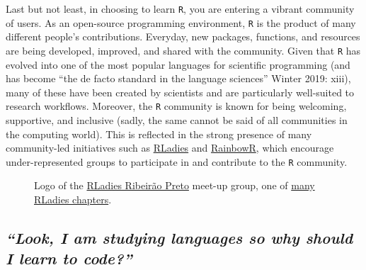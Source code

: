 \documentclass[
  letterpaper,
  DIV=11,
  numbers=noendperiod,
  oneside]{scrreprt}
\begin{document}
Last but not least, in choosing to learn \texttt{R}, you are entering a
vibrant community of users. As an open-source programming environment,
\texttt{R} is the product of many different people's contributions.
Everyday, new packages, functions, and resources are being developed,
improved, and shared with the community. Given that \texttt{R} has
evolved into one of the most popular languages for scientific
programming (and has become ``the de facto standard in the language
sciences'' Winter 2019: xiii), many of these have been created by
scientists and are particularly well-suited to research workflows.
Moreover, the \texttt{R} community is known for being welcoming,
supportive, and inclusive (sadly, the same cannot be said of all
communities in the computing world). This is reflected in the strong
presence of many community-led initiatives such as
\href{https://rladies.org/}{RLadies} and
\href{https://rainbowr.netlify.app/}{RainbowR}, which encourage
under-represented groups to participate in and contribute to the
\texttt{R} community. 🤗

\begin{figure}


\caption{\label{fig-RLadies}Logo of the
\href{https://rladiesrp.github.io/}{RLadies Ribeirão Preto} meet-up
group, one of
\href{https://benubah.github.io/r-community-explorer/rladies.html}{many
RLadies chapters}.}

\end{figure}%

\subsection*{\texorpdfstring{\emph{``Look, I am studying languages so
why should I learn to code?''}
🤔}{``Look, I am studying languages so why should I learn to code?'' 🤔}}\label{look-i-am-studying-languages-so-why-should-i-learn-to-code}
\end{document}

